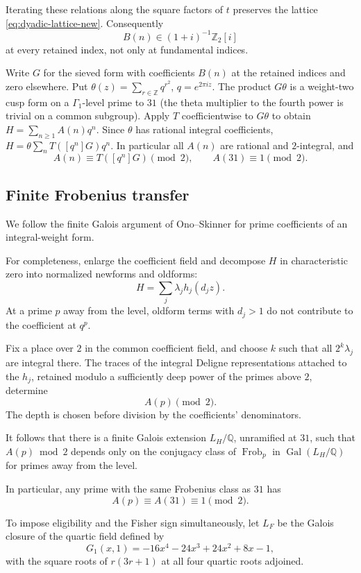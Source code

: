 \documentclass[11pt]{article}
\begin{document}
Iterating these relations along the
square factors of $t$ preserves the
lattice \eqref{eq:dyadic-lattice-new}.
Consequently
\[
B(n)\in(1+i)^{-1}\mathbb Z_2[i]
\]
at every retained index, not only
at fundamental indices.

Write $G$ for the sieved form with coefficients $B(n)$ at the retained
indices and zero elsewhere. Put $\theta(z)=\sum_{r\in\mathbb Z}q^{r^2}$,
$q=e^{2\pi iz}$. The product $G\theta$ is a weight-two cusp form on a
$\Gamma_1$-level prime to $31$ (the theta multiplier to the fourth
power is trivial on a common subgroup). Apply $T$ coefficientwise
to $G\theta$ to obtain $H=\sum_{n\ge1}A(n)q^n$. Since $\theta$ has
rational integral coefficients, $H=\theta\sum_n T([q^n]G)q^n$.
In particular all $A(n)$ are rational and $2$-integral, and
\[
 A(n)\equiv T([q^n]G)\pmod2,\qquad A(31)\equiv1\pmod2.
\]

\subsection{Finite Frobenius transfer}

We follow the finite Galois argument of Ono--Skinner \cite{OS}
for prime coefficients of an integral-weight form.

For completeness, enlarge the coefficient
field and decompose $H$ in characteristic
zero into normalized newforms and
oldforms:
\[
H=\sum_j\lambda_j h_j(d_jz).
\]
At a prime $p$ away from the level,
oldform terms with $d_j>1$ do not
contribute to the coefficient at $q^p$.

Fix a place over $2$ in the common coefficient field, and choose $k$
such that all $2^k\lambda_j$ are integral there.
The traces of the integral Deligne
representations attached to the $h_j$,
retained modulo a sufficiently deep
power of the primes above $2$, determine
\[
A(p)\pmod2.
\]
The depth is chosen before division by
the coefficients' denominators.

It follows that there is a finite
Galois extension $L_H/\mathbb Q$,
unramified at $31$, such that
$A(p)\bmod2$ depends only on the
conjugacy class of
$\operatorname{Frob}_p$ in
$\operatorname{Gal}(L_H/\mathbb Q)$
for primes away from the level.

In particular, any prime with the
same Frobenius class as $31$ has
\[
A(p)\equiv A(31)\equiv1\pmod2.
\]

To impose eligibility and the Fisher
sign simultaneously, let $L_F$ be the
Galois closure of the quartic field
defined by
\[
G_1(x,1)=-16x^4-24x^3+24x^2+8x-1,
\]
with the square roots of
$r(3r+1)$ at all four quartic roots
adjoined.
\end{document}
